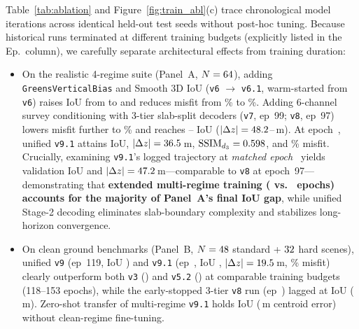 \documentclass[11pt,a4paper]{article}
\begin{document}
Table~\ref{tab:ablation} and Figure~\ref{fig:train_abl}(c) trace chronological model iterations across identical held-out test seeds without post-hoc tuning. Because historical runs terminated at different training budgets (explicitly listed in the Ep.\ column), we carefully separate architectural effects from training duration:
\begin{itemize}[leftmargin=1.4em,itemsep=0.25em]
  \item On the realistic 4-regime suite (Panel~A, $N=64{}$), adding \texttt{GreensVerticalBias} and Smooth 3D IoU (\texttt{v6} $\to$ \texttt{v6.1}, warm-started from \texttt{v6}) raises IoU from \valAblVSixIoU{} to \valAblVSixOneIoU{} and reduces misfit from \valAblVSixMisfit{}\% to \valAblVSixOneMisfit{}\%. Adding 6-channel survey conditioning with 3-tier slab-split decoders (\texttt{v7}, ep~99; \texttt{v8}, ep~97) lowers misfit further to \valAblVEightMisfit{}\% and reaches \valAblVSevenIoU{}--\valAblVEightIoU{} IoU ($|\Delta z| = 48.2{}$--\valAblVSevenDz{}\,m). At epoch~\valVNineOneEp{}, unified \texttt{v9.1} attains \valAblVNineOneIoU{} IoU, $|\Delta z| = 36.5{}$\,m, $\text{SSIM}_{d_3} = 0.598{}$, and \valAblVNineOneMisfit{}\% misfit. Crucially, examining \texttt{v9.1}'s logged trajectory at \emph{matched epoch~\valMatchedEp{}} yields validation IoU \valMatchedIoU{} and $|\Delta z| = 47.2{}$\,m---comparable to \texttt{v8} at epoch~97---demonstrating that \textbf{extended multi-regime training (\valVNineOneEp{} vs.\ \valMatchedEp{} epochs) accounts for the majority of Panel~A's final IoU gap}, while unified Stage-2 decoding eliminates slab-boundary complexity and stabilizes long-horizon convergence.
  \item On clean ground benchmarks (Panel~B, $N=48{}$ standard + $32{}$ hard scenes), unified \texttt{v9} (ep~119, IoU \valCleanVNineIoU{}) and \texttt{v9.1} (ep~\valVNineOneCleanEp{}, IoU \valCleanVNineOneIoU{}, $|\Delta z|=19.5{}$\,m, \valCleanVNineOneMisfit{}\% misfit) clearly outperform both \texttt{v3} (\valCleanVThreeIoU{}) and \texttt{v5.2} (\valCleanVFiveTwoIoU{}) at comparable training budgets (118--153 epochs), while the early-stopped 3-tier \texttt{v8} run (ep~\valCleanVEightEp{}) lagged at \valCleanVEightIoU{} IoU (\valCleanVEightDz{}\,m). Zero-shot transfer of multi-regime \texttt{v9.1} holds \valCleanHardXferIoU{} IoU (\valCleanHardXferDz{}\,m centroid error) without clean-regime fine-tuning.
\end{itemize}
\end{document}
